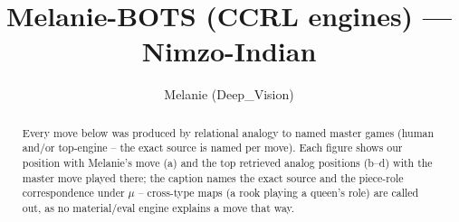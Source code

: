 \documentclass[11pt]{article}
\title{Melanie-BOTS (CCRL engines) — Nimzo-Indian}
\author{Melanie (Deep\_Vision)}
\date{}
\begin{document}
\maketitle

\begin{abstract}Every move below was produced by relational analogy to named master games (human and/or top-engine -- the exact source is named per move). Each figure shows our position with Melanie's move (a) and the top retrieved analog positions (b--d) with the master move played there; the caption names the exact source and the piece-role correspondence under $\mu$ -- cross-type maps (a rook playing a queen's role) are called out, as no material/eval engine explains a move that way.\end{abstract}

\begin{figure}[p]\centering
\begin{subfigure}{0.46\textwidth}\centering
\resizebox{\linewidth}{!}{%
\newchessgame
\chessboard[
  setfen={rnbq1rk1/pp3ppp/4pn2/2pp4/1bPP4/2NBPN2/PP3PPP/R1BQK2R w KQ - 0 7},
  showmover=false,
  pgfstyle=straightmove, color=movearrow, markmove={e1-g1}
]}
\caption{}
\end{subfigure}\hfill
\begin{subfigure}{0.46\textwidth}\centering
\resizebox{\linewidth}{!}{%
\newchessgame
\chessboard[
  setfen={rnbq1rk1/pp3ppp/4pn2/2pp4/1bPP4/2NBPN2/PP3PPP/R1BQK2R w KQ - 0 7},
  showmover=false,
  pgfstyle=straightmove, color=movearrow, markmove={e1-g1}
]}
\caption{}
\end{subfigure}
\\[4pt]
\begin{subfigure}{0.46\textwidth}\centering
\resizebox{\linewidth}{!}{%
\newchessgame
\chessboard[
  setfen={rnbq1rk1/pp3ppp/4pn2/2pp4/1bPP4/2NBPN2/PP3PPP/R1BQK2R w KQ - 0 7},
  showmover=false,
  pgfstyle=straightmove, color=movearrow, markmove={e1-g1}
]}
\caption{}
\end{subfigure}\hfill
\begin{subfigure}{0.46\textwidth}\centering
\resizebox{\linewidth}{!}{%
\newchessgame
\chessboard[
  setfen={rnbq1rk1/pp3ppp/4pn2/2pp4/1bPP4/2NBPN2/PP3PPP/R1BQK2R w KQ - 0 7},
  showmover=false,
  pgfstyle=straightmove, color=movearrow, markmove={e1-g1}
]}
\caption{}
\end{subfigure}

\end{figure}
\end{document}
